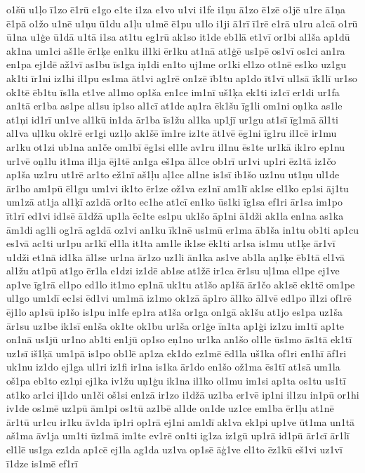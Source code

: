 {o1šū
u1ļo
ī1zo
ē1rū
e1go
e1te
i1za
e1vo
u1vi
i1fe
i1ņu
ā1zo
ē1zē
o1jē
u1re
ā1ņa
ē1pā
o1žo
u1nē
u1ņu
ū1du
a1ļu
u1mē
ē1pu
u1lo
i1ji
ā1rī
ī1rē
e1rā
u1ru
a1cā
o1rū
ū1na
u1ģe
ū1dā
u1tā
i1sa
at1tu
eg1rū
ak1so
it1de
eb1lā
et1vī
or1bi
al1ša
ap1dū
ak1na
um1ci
aš1le
ēr1ķe
en1ku
il1ki
ēr1ku
at1nā
at1ģē
us1pē
os1vī
os1ci
an1ra
en1pa
ej1dē
až1vī
as1bu
īs1ga
iņ1di
en1to
uj1me
or1ki
el1zo
ot1nē
es1ko
uz1gu
ak1ti
īr1ni
iz1hi
il1pu
es1ma
āt1vi
ag1rē
on1zē
īb1tu
ap1do
īt1vī
ul1sā
īk1lī
ur1so
ok1tē
ēb1tu
īs1la
et1ve
al1mo
op1ša
en1ce
im1nī
uš1ķa
ek1ti
iz1cī
er1di
ur1fa
an1tā
er1ba
as1pe
al1su
ip1so
al1cī
at1de
aņ1ra
ēk1šu
īg1li
om1ni
oņ1ka
as1le
at1ņi
id1rī
un1ve
al1kū
in1da
ār1ba
īs1žu
al1ka
up1jī
ur1gu
at1sī
īg1mā
āl1ti
al1va
uļ1ku
ok1rē
er1gi
uz1ļo
ak1šē
īm1re
iz1te
āt1vē
ēg1ni
īg1ru
il1cē
ir1mu
ar1ku
ot1zi
ub1na
an1če
om1bī
ēg1si
el1le
av1ru
il1nu
ēs1te
ur1kā
ik1ro
ep1nu
ur1vē
oņ1lu
it1ma
il1ja
ēj1tē
an1ga
eš1pa
āl1ce
ob1rī
ur1vi
up1ri
ēz1tā
iz1čo
ap1ša
uz1ru
ut1rē
ar1to
ež1nī
aš1ļu
aļ1ce
al1ne
is1sī
ib1šo
uz1nu
ut1ņu
ul1de
ār1ho
am1pū
ēl1gu
um1vi
ik1to
ēr1ze
ož1va
ez1nī
am1lī
ak1se
el1ko
ep1si
āj1tu
um1zā
at1ja
al1ķī
az1dā
or1to
ec1he
at1cī
en1ko
ūs1ki
īg1sa
ef1ri
ār1sa
im1po
īt1rī
ed1vi
id1sē
ā1džā
up1la
ēc1te
es1pu
uk1šo
āp1ni
ā1dži
ak1la
en1na
as1ka
ām1di
ag1li
og1rā
ag1dā
oz1vi
an1ku
īk1nē
us1mū
er1ma
āb1ša
in1tu
ob1ti
ap1cu
es1vā
ac1ti
ur1pu
ar1kī
el1la
it1ta
am1le
ik1se
ēk1ti
ar1sa
is1mu
ut1ķe
ār1vī
u1dži
et1nā
id1ka
āl1se
ur1na
ār1zo
uz1li
ān1ka
as1ve
ab1la
aņ1ķe
ēb1tā
el1vā
al1žu
at1pū
at1go
ēr1la
e1dzi
iz1dē
ab1se
at1žē
ir1ca
ēr1su
uļ1ma
el1pe
ej1ve
ap1ve
īg1rā
el1po
ed1lo
it1mo
ep1nā
uk1tu
at1šo
ap1šā
ār1čo
ak1sē
ek1tē
om1pe
ul1go
um1dī
ec1si
ēd1vi
um1mā
iz1mo
ok1zā
āp1ro
āl1ko
āl1vē
ed1po
īl1zi
of1rē
ēj1lo
ap1sū
ip1šo
is1pu
in1fe
ep1ra
at1ša
or1ga
on1gā
ak1šu
at1jo
es1pa
uz1ša
ār1su
uz1be
ik1sī
en1ša
ok1te
ok1bu
ur1ša
or1ģe
īn1ta
ap1ģi
iz1zu
im1tī
ap1te
on1nā
us1jū
ur1no
ab1ti
en1jū
op1so
eņ1no
ur1ka
an1šo
ol1le
ūs1mo
ās1tā
ek1tī
uz1sī
iš1ķā
um1pā
is1po
ob1lē
ap1za
ek1do
ez1mē
ēd1la
uš1ka
of1ri
en1hī
āf1ri
uk1nu
iz1do
ej1ga
ul1ri
iz1fi
ir1na
is1ka
ār1do
en1šo
ož1ma
ēs1tī
at1sā
um1la
oš1pa
eb1to
ez1ņi
ej1ka
iv1žu
uņ1ģu
ik1na
il1ko
ol1mu
im1si
ap1ta
os1tu
us1tī
at1ko
ar1ci
iļ1do
un1či
oš1si
en1zā
ir1zo
i1džā
uz1ba
er1vē
ip1ni
il1zu
in1pū
or1hi
iv1de
os1mē
uz1pū
ām1pi
os1tū
az1bē
al1de
on1de
uz1ce
em1ba
ēr1ļu
at1nē
ār1tū
ur1cu
ir1ku
āv1da
īp1ri
op1rā
ej1ni
am1dī
ak1va
ek1pi
up1ve
ūt1ma
un1tā
aš1ma
āv1ja
um1ti
ūz1mā
im1te
ev1rē
on1ti
ig1za
iz1gū
up1rā
id1pū
ār1cī
ār1lī
el1lē
us1ga
ez1da
ap1cē
ej1la
ag1da
uz1va
op1sē
āģ1ve
el1to
ēz1kū
eš1vi
uz1vī
ī1dze
is1mē
ef1rī
}
